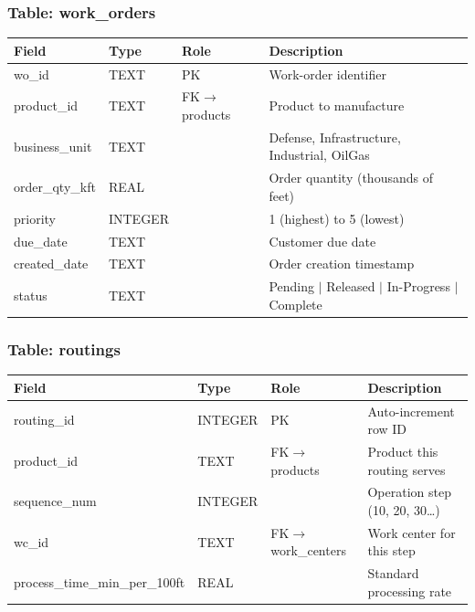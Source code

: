 \documentclass[11pt]{article}
\begin{document}
\subsubsection*{Table: work\_orders}
\begin{table}[H]\centering\small
\begin{tabular}{@{} l l l L{6cm} @{}}
\toprule
\textbf{Field} & \textbf{Type} & \textbf{Role} & \textbf{Description} \\
\midrule
wo\_id       & TEXT     & PK  & Work-order identifier \\
product\_id  & TEXT     & FK$\to$products & Product to manufacture \\
business\_unit & TEXT   &     & Defense, Infrastructure, Industrial, OilGas \\
order\_qty\_kft & REAL  &     & Order quantity (thousands of feet) \\
priority     & INTEGER  &     & 1 (highest) to 5 (lowest) \\
due\_date    & TEXT     &     & Customer due date \\
created\_date & TEXT    &     & Order creation timestamp \\
status       & TEXT     &     & Pending $\mid$ Released $\mid$ In-Progress $\mid$ Complete \\
\bottomrule
\end{tabular}
\end{table}

\subsubsection*{Table: routings}
\begin{table}[H]\centering\small
\begin{tabular}{@{} l l l L{6cm} @{}}
\toprule
\textbf{Field} & \textbf{Type} & \textbf{Role} & \textbf{Description} \\
\midrule
routing\_id   & INTEGER & PK  & Auto-increment row ID \\
product\_id   & TEXT    & FK$\to$products & Product this routing serves \\
sequence\_num & INTEGER &     & Operation step (10, 20, 30\ldots) \\
wc\_id        & TEXT    & FK$\to$work\_centers & Work center for this step \\
process\_time\_min\_per\_100ft & REAL & & Standard processing rate \\
\bottomrule
\end{tabular}
\end{table}
\end{document}
